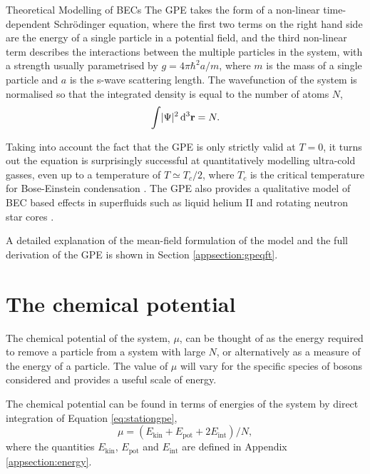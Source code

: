 \begin{chapter}{\label{cha:theoretical_model}Theoretical Modelling of BECs}
The GPE takes the form of a non-linear time-dependent Schr\"odinger equation, where the first two terms on the right hand side are the energy of a single particle in a potential field, and the third non-linear term describes the interactions between the multiple particles in the system, with a strength usually parametrised by $g=4\pi\hbar^2a/m$,
where $m$ is the mass of a single particle and $a$ is the s-wave scattering length. The wavefunction of the system is normalised so that the integrated density is equal to the number of atoms $N$,
\begin{equation}
\int\!|\Psi|^2\,{\rm d}^3{\bf r} = N.
\label{eq:normalisewf}
\end{equation}

Taking into account the fact that the GPE is only strictly valid at $T=0$, it turns out the equation is surprisingly successful at quantitatively modelling ultra-cold gasses, even up to a temperature of $T\simeq T_c/2$, where $T_c$ is the critical temperature for Bose-Einstein condensation \cite{Proukakis}. The GPE also provides a qualitative model of BEC based effects in superfluids such as liquid helium II \cite{RobertsBerloff} and rotating neutron star cores \cite{Warszawski01082011}.

A detailed explanation of the mean-field formulation of the model and the full derivation of the GPE is shown in Section \ref{appsection:gpeqft}.

\section{\label{section:mu} The chemical potential}
 The chemical potential of the system, $\mu$, can be thought of as the energy required to remove a particle from a system with large $N$, or alternatively as a measure of the energy of a particle. The value of $\mu$ will vary for the specific species of bosons considered and provides a useful scale of energy.
 
 The chemical potential can be found in terms of energies of the system by direct integration of Equation \ref{eq:stationgpe},
 	\begin{equation}\label{eq:chempot}
 		\mu = \left ( E_{\mathrm{kin}} + E_{\mathrm{pot}} + 2E_{\mathrm{int}} \right ) / N,
 	\end{equation}
 	where the quantities $E_{\mathrm{kin}}$, $E_{\mathrm{pot}}$ and $E_{\mathrm{int}}$ are defined in Appendix \ref{appsection:energy}.


\end{chapter}
